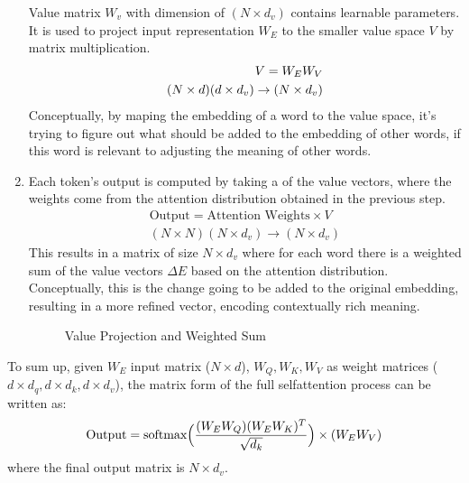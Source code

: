 \documentclass[letterpaper,11pt,english]{sphinxmanual}
\begin{document}
\begin{enumerate}
\sphinxAtStartPar
Value matrix \(W_v\) with dimension of \((N \times d_v)\)
contains learnable parameters. It is used to project input
representation \(W_E\) to the smaller value space \(V\) by
matrix multiplication.
\begin{equation*}
\begin{split}V = W_E W_V \\ \space (N \times d) (d \times d_v) \rightarrow (N \times d_v)\end{split}
\end{equation*}
\sphinxAtStartPar
Conceptually, by maping the embedding of a word to the value space,
it’s trying to figure out what should be added to the embedding of
other words, if this word is relevant to adjusting the meaning of
other words.

\item {} 
\sphinxAtStartPar
{}

\sphinxAtStartPar
Each token’s output is computed by taking a  of the
value vectors, where the weights come from the attention distribution
obtained in the previous step.
\begin{equation*}
\begin{split}\text{Output} = \text{Attention Weights} \times V\\
(N \times N) (N \times d_v) \rightarrow (N \times d_v)\end{split}
\end{equation*}
\sphinxAtStartPar
This results in a matrix of size \(N \times d_v\) where for each
word there is a weighted sum of the value vectors \(\Delta E\)
based on the attention distribution. Conceptually, this is the change
going to be added to the original embedding, resulting in a more
refined vector, encoding contextually rich meaning.

\begin{figure}[htbp]
\centering
\capstart

\noindent{}
\caption{Value Projection and Weighted Sum}\label{\detokenize{pretraining:id11}}\end{figure}

\end{enumerate}

\sphinxAtStartPar
To sum up, given \(W_E\) input matrix (\(N \times d\)),
\(W_Q, W_K, W_V\) as weight matrices
(\(d\times d_q, d\times d_k, d\times d_v\)), the matrix form of the
full self\sphinxhyphen{}attention process can be written as:
\begin{equation*}
\begin{split}\text{Output} = \text{softmax}\Big({(W_EW_Q)(W_EW_K)^T \over \sqrt{d_k}}\Big) \times (W_EW_V)\end{split}
\end{equation*}
\sphinxAtStartPar
where the final output matrix is \(N \times d_v\).
\end{document}
